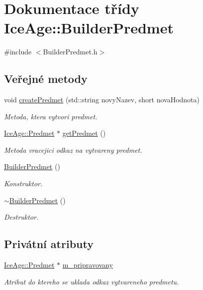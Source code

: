 \hypertarget{classIceAge_1_1BuilderPredmet}{}\section{Dokumentace třídy Ice\+Age\+:\+:Builder\+Predmet}
\label{classIceAge_1_1BuilderPredmet}


{\ttfamily \#include $<$Builder\+Predmet.\+h$>$}

\subsection*{Veřejné metody}
\begin{DoxyCompactItemize}
\item 
void \hyperlink{classIceAge_1_1BuilderPredmet_a4fcdb35cc3edcec69386f4a68ff95d28}{create\+Predmet} (std\+::string novy\+Nazev, short nova\+Hodnota)
\begin{DoxyCompactList}\small\item\em Metoda, ktera vytvori predmet. \end{DoxyCompactList}\item 
\hyperlink{classIceAge_1_1Predmet}{Ice\+Age\+::\+Predmet} $\ast$ \hyperlink{classIceAge_1_1BuilderPredmet_ab84508589d73e202dd4002d6b23ad22e}{get\+Predmet} ()
\begin{DoxyCompactList}\small\item\em Metoda vracejici odkaz na vytvareny predmet. \end{DoxyCompactList}\item 
\hyperlink{classIceAge_1_1BuilderPredmet_ab13db2f68a2c79a59e093fcb8d517f04}{Builder\+Predmet} ()
\begin{DoxyCompactList}\small\item\em Konstruktor. \end{DoxyCompactList}\item 
\hyperlink{classIceAge_1_1BuilderPredmet_a4fdc3033e390d15dc12c540b2b6c6456}{$\sim$\+Builder\+Predmet} ()
\begin{DoxyCompactList}\small\item\em Destruktor. \end{DoxyCompactList}\end{DoxyCompactItemize}
\subsection*{Privátní atributy}
\begin{DoxyCompactItemize}
\item 
\hyperlink{classIceAge_1_1Predmet}{Ice\+Age\+::\+Predmet} $\ast$ \hyperlink{classIceAge_1_1BuilderPredmet_ab51158b23493b9c1bb891f8be4a69b5d}{m\+\_\+pripravovany}
\begin{DoxyCompactList}\small\item\em Atribut do ktereho se uklada odkaz vytvareneho predmetu. \end{DoxyCompactList}\end{DoxyCompactItemize}



